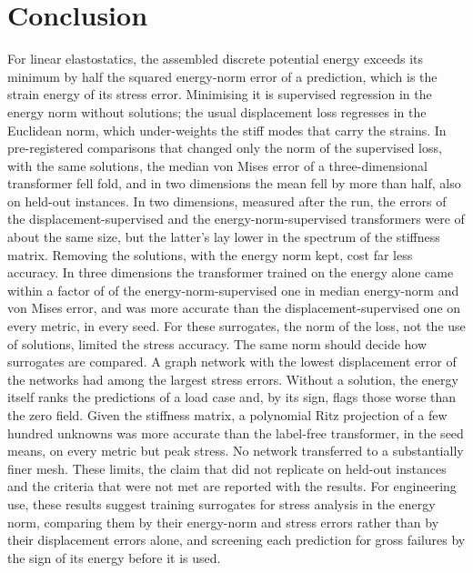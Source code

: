 \section{Conclusion}\label{sec:conclusion}

For linear elastostatics, the assembled discrete potential energy exceeds its minimum by half
the squared energy-norm error of a prediction, which is the strain energy of its stress error.
Minimising it is supervised regression in the energy norm without solutions; the usual
displacement loss regresses in the Euclidean norm, which under-weights the stiff modes that
carry the strains. In pre-registered comparisons that changed only the norm of the
supervised loss, with the same solutions, the median von Mises error of a three-dimensional
transformer fell \numNlThreeNormVmWord{}fold, and in two dimensions the mean fell by more than half, also on held-out instances. In two dimensions, measured after the run, the errors of the
displacement-supervised and the energy-norm-supervised transformers were of about the same
size, but the latter's lay lower in the spectrum of the stiffness matrix. Removing the solutions, with the energy norm
kept, cost far less accuracy. In three dimensions the
transformer
trained on the energy alone came within a factor of \numNlThreeLabelWithin{} of the
energy-norm-supervised one in median energy-norm and von Mises error, and was more accurate
than the displacement-supervised one on every metric, in every seed. For these surrogates,
the norm of the loss, not the use of solutions, limited the stress accuracy. The same norm
should decide how surrogates are compared. A graph network with the lowest displacement error
of the networks had among the largest stress errors. Without a solution, the energy itself
ranks the predictions of a load case and, by its sign, flags those worse than the zero field.
Given the stiffness matrix, a polynomial Ritz projection of a few hundred unknowns was more
accurate than the label-free transformer, in the seed means, on every metric but peak
stress. No network transferred to a substantially finer mesh. These limits, the
claim that did not replicate on held-out instances and the criteria that were not met are
reported with the results. For engineering use, these results suggest training surrogates
for stress analysis in the energy norm, comparing them by their energy-norm and stress
errors rather than by their displacement errors alone, and screening each prediction for
gross failures by the sign of its energy before it is used.
